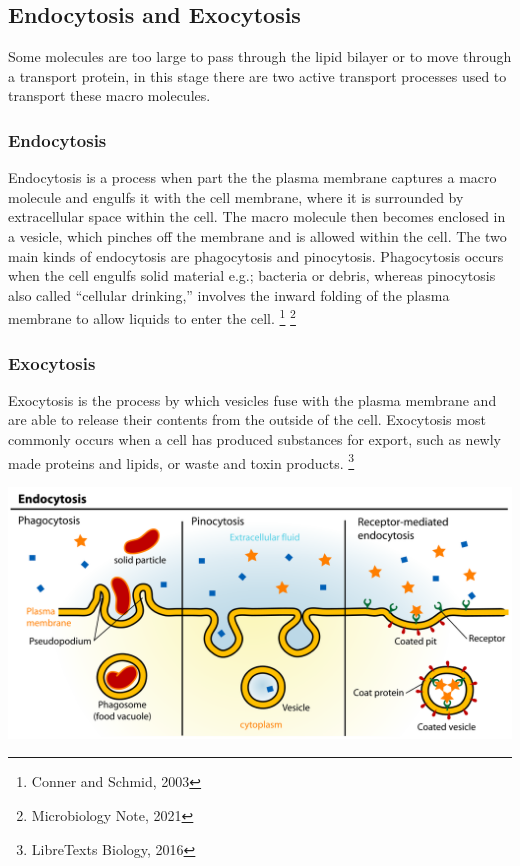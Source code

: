\documentclass[a4paper,12pt,twoside,english]{all-in-one} %
\begin{document}
\subsection{Endocytosis and Exocytosis}
Some molecules are too large to pass through the lipid bilayer or to move through a transport protein, in this stage there are two active transport processes used to transport these macro molecules.

\subsubsection{Endocytosis}
Endocytosis is a process when part the the plasma membrane captures a macro molecule and engulfs it with the cell membrane, where it is surrounded by extracellular space within the cell. The macro molecule then becomes enclosed in a vesicle, which pinches off the membrane and is allowed within the cell. The two main kinds of endocytosis are phagocytosis and pinocytosis. Phagocytosis occurs when the cell engulfs solid material e.g.; bacteria or debris, whereas pinocytosis also called “cellular drinking,” involves the inward folding of the plasma membrane to allow liquids to enter the cell. \footnote{Conner and Schmid, 2003} \footnote{Microbiology Note, 2021}

\subsubsection{Exocytosis}
Exocytosis is the process by which vesicles fuse with the plasma membrane and are able to release their contents from the outside of the cell. Exocytosis most commonly occurs when a cell has produced substances for export, such as newly made proteins and lipids, or waste and toxin products. \footnote{LibreTexts Biology, 2016}

\includegraphics[scale=0.4]{images/4.png}
\end{document}
